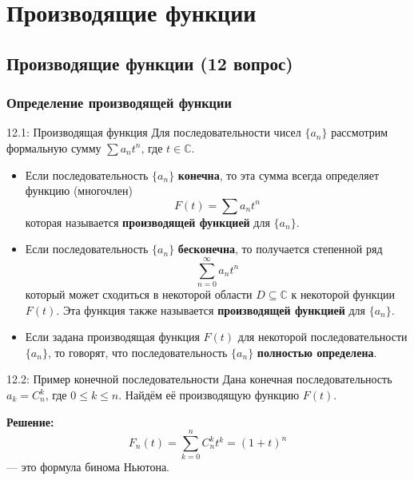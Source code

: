 \documentclass[a4paper,12pt]{article}
\begin{document}
	
	
	
	
	
	
	
	
	
	\newpage
	\section{Производящие функции}
	
	\subsection{Производящие функции (12 вопрос)}
	
	\subsubsection{Определение производящей функции}
	
	\begin{definitionbox}{12.1: Производящая функция}
		Для последовательности чисел \(\{a_n\}\) рассмотрим формальную сумму \(\sum a_n t^n\), где \(t \in \mathbb{C}\).
		
		\begin{itemize}
			\item Если последовательность \(\{a_n\}\) \textbf{конечна}, то эта сумма всегда определяет функцию (многочлен)
			\[ F(t) = \sum a_n t^n \]
			которая называется \textbf{производящей функцией} для \(\{a_n\}\).
			
			\item Если последовательность \(\{a_n\}\) \textbf{бесконечна}, то получается степенной ряд
			\[ \sum_{n=0}^\infty a_n t^n \]
			который может сходиться в некоторой области \(D \subseteq \mathbb{C}\) к некоторой функции \(F(t)\). Эта функция также называется \textbf{производящей функцией} для \(\{a_n\}\).
				
			\item Если задана производящая функция \(F(t)\) для некоторой последовательности \(\{a_n\}\), то говорят, что последовательность \(\{a_n\}\) \textbf{полностью определена}.
		\end{itemize}	
	\end{definitionbox}
	
	\begin{examplebox}{12.2: Пример конечной последовательности}
		Дана конечная последовательность \(a_k = C_n^k\), где \(0 \leq k \leq n\). Найдём её производящую функцию \(F(t)\).
		
		\textbf{Решение:}
		\[ F_n(t) = \sum_{k=0}^n C_n^k t^k = (1 + t)^n \]
		— это формула бинома Ньютона.
	\end{examplebox}
	
\end{document}

